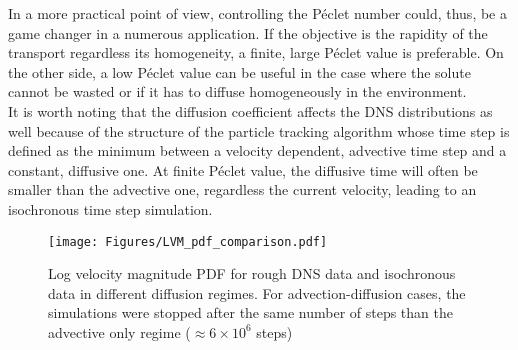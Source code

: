 In a more practical point of view, controlling the Péclet number could, thus, be a game changer in a numerous application. If the objective is the rapidity of the transport regardless its homogeneity, a finite, large Péclet value is preferable. On the other side, a low Péclet value can be useful in the case where the solute cannot be wasted or if it has to diffuse homogeneously in the environment.\\

It is worth noting that the diffusion coefficient affects the DNS distributions as well because of the structure of the particle tracking algorithm whose time step is defined as the minimum between a velocity dependent, advective time step and a constant, diffusive one.
At finite Péclet value, the diffusive time will often be smaller than the advective one, regardless the current velocity, leading to an isochronous time step simulation.\\
\begin{figure}[h!]
	\centering
	\texttt{[image: Figures/LVM\_pdf\_comparison.pdf]}
	\caption{Log velocity magnitude PDF for rough DNS data and isochronous data in different diffusion regimes. For advection-diffusion cases, the simulations were stopped after the same number of steps than the advective only regime ($\approx6\times 10^6$ steps) }
	\label{fig:lvm_pdf_pe}
\end{figure}
